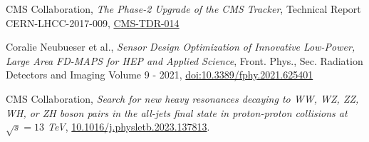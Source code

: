 {\begin{flushleft}

\end{flushleft}

\vskip 10pt
\begin{thebibliography}{9}

\bibitem{[1]}
CMS Collaboration, {\em The Phase-2 Upgrade of the CMS Tracker}, Technical Report CERN-LHCC-2017-009, \href{https://cds.cern.ch/record/2272264?ln=en}{CMS-TDR-014}

\bibitem{[2]}
Coralie Neubueser et al., {\em Sensor Design Optimization of Innovative Low-Power, Large Area FD-MAPS for HEP and Applied Science}, Front. Phys., Sec. Radiation Detectors and Imaging
Volume 9 - 2021, \href{https://doi.org/10.3389/fphy.2021.625401}{doi:10.3389/fphy.2021.625401}


\bibitem{[3]}
CMS Collaboration, {\em Search for new heavy resonances decaying to WW, WZ, ZZ, WH, or ZH boson pairs in the all-jets final state in proton-proton collisions at $\sqrt{s}=13$ TeV},
\href{http://dx.doi.org/10.1016/j.physletb.2023.137813}{10.1016/j.physletb.2023.137813}.


\end{thebibliography}}
